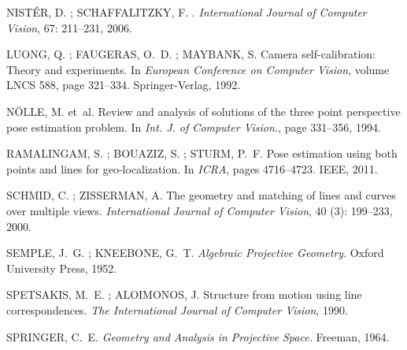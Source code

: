 \documentclass[a4paper,12pt,oneside,onecolumn,final,fleqn]{repUERJ}
\begin{document}
\begin{thebibliography}{33}
NISTÉR, D. ; SCHAFFALITZKY, F.
.
\newblock \emph{International Journal of Computer Vision}, 67:
  211--231, 2006.

LUONG, Q. ; FAUGERAS, O.~D. ; MAYBANK, S.
\newblock Camera self-calibration: Theory and experiments.
\newblock In \emph{European Conference on Computer Vision}, volume LNCS 588,
  page 321–334. Springer-Verlag, 1992.

N{\"O}LLE, M. et~al.
\newblock Review and analysis of solutions of the three point perspective pose
  estimation problem.
\newblock In \emph{Int. J. of Computer Vision.}, page 331–356, 1994.

RAMALINGAM, S. ; BOUAZIZ, S. ; STURM, P.~F.
\newblock Pose estimation using both points and lines for geo-localization.
\newblock In \emph{ICRA}, pages 4716--4723. IEEE, 2011.

SCHMID, C. ; ZISSERMAN, A.
\newblock The geometry and matching of lines and curves over multiple views.
\newblock \emph{International Journal of Computer Vision}, 40
  (3): 199--233, 2000.

SEMPLE, J.~G. ; KNEEBONE, G.~T.
\newblock \emph{Algebraic Projective Geometry}.
\newblock Oxford University Press, 1952.

SPETSAKIS, M.~E. ; ALOIMONOS, J.
\newblock Structure from motion using line correspondences.
\newblock \emph{The International Journal of Computer Vision}, 1990.

SPRINGER, C.~E.
\newblock \emph{Geometry and Analysis in Projective Space.}
\newblock Freeman, 1964.  
\end{thebibliography}

\appendix
\label{sec.Apen-A}
\end{document}
